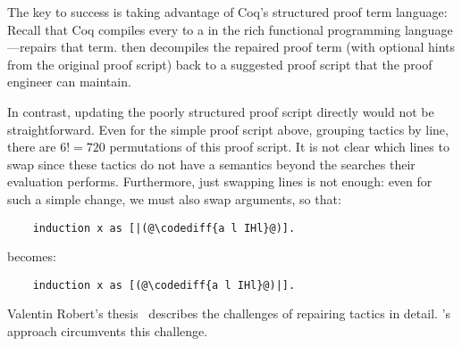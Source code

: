 The key to success is taking advantage of Coq's structured proof term language:
Recall that Coq compiles every  to a  in the rich functional programming language
---\toolnamec repairs that term.
\toolnamec then decompiles the repaired proof term (with optional hints from the original proof script) back 
to a suggested proof script that the proof engineer can maintain.

In contrast, updating the poorly structured proof script directly would not be straightforward.
Even for the simple proof script above, grouping tactics by line, there are $6! = 720$ permutations of this proof script.
It is not clear which lines to swap since these tactics do not have a semantics beyond the searches their evaluation performs.
Furthermore, just swapping lines is not enough: even for such a simple change, we must also swap
arguments, so that:

\begin{lstlisting}
    induction x as [|(@\codediff{a l IHl}@)].
\end{lstlisting}
becomes:

\begin{lstlisting}
    induction x as [(@\codediff{a l IHl}@)|].
\end{lstlisting}
Valentin Robert's thesis~\cite{robert2018} describes the challenges of repairing tactics in detail.
\toolnamec's approach circumvents this challenge.



